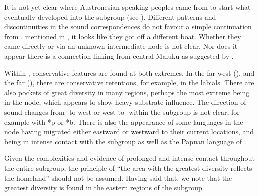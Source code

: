 It is not yet clear where Austronesian-speaking peoples came
from to start what eventually developed into the  subgroup (see ).
Different patterns and discontinuities in the sound correspondences
do not favour a simple continuation from .
 mentioned in ,
it looks like they got off a different boat.
Whether they came directly or via an unknown intermediate node is not clear.
Nor does it appear there is a connection linking from central
Maluku as suggested by \citet{Blust1993,Blust2008}.

Within , conservative features are found at both extremes.
In the far west (),
and the far  (),
there are conservative retentions,
for example, in the labials.
There are also pockets of great diversity in many regions,
perhaps the most extreme being in the 
node, which appears to show heavy substrate influence.
The direction of sound changes from -to-west or west-to-
within the subgroup is not clear,
for example with *p or *b.
There is also the appearance of some languages in the  node having migrated either eastward or westward to their
current locations, and being in intense contact with the  subgroup
as well as the Papuan language of .

Given the complexities and evidence of prolonged
and intense contact throughout the entire subgroup,
the principle of “the area with the greatest diversity reflects
the homeland” should not be assumed.
Having said that, we note that the greatest diversity is found
in the eastern regions of the subgroup.